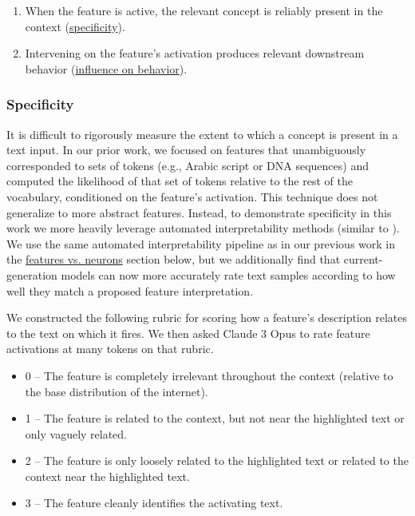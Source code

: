 \documentclass{article}
\begin{document}
\begin{enumerate}
    \item When the feature is active, the relevant concept is reliably present in the context (\hyperref[sec:assessing-tour-specificity]{specificity}).
    \item Intervening on the feature’s activation produces relevant downstream behavior (\hyperref[sec:assessing-tour-influence]{influence on behavior}).
\end{enumerate}

\subsubsection{Specificity}\label{sec:assessing-tour-specificity}

It is difficult to rigorously measure the extent to which a concept is present in a text input. In our prior work, we focused on features that unambiguously corresponded to sets of tokens (e.g., Arabic script or DNA sequences) and computed the likelihood of that set of tokens relative to the rest of the vocabulary, conditioned on the feature’s activation. This technique does not generalize to more abstract features. Instead, to demonstrate specificity in this work we more heavily leverage automated interpretability methods (similar to \cite{bills2023language,bricken2023monosemanticity}). We use the same automated interpretability pipeline as in our previous work \cite{bricken2023monosemanticity} in the \hyperref[sec:assessing-features-v-neurons]{features vs. neurons} section below, but we additionally find that current-generation models can now more accurately rate text samples according to how well they match a proposed feature interpretation.

We constructed the following rubric for scoring how a feature’s description relates to the text on which it fires. We then asked Claude 3 Opus to rate feature activations at many tokens on that rubric.

\begin{itemize}
    \item 0 -- The feature is completely irrelevant throughout the context (relative to the base distribution of the internet).
    \item 1 -- The feature is related to the context, but not near the highlighted text or only vaguely related.
    \item 2 -- The feature is only loosely related to the highlighted text or related to the context near the highlighted text.
    \item 3 -- The feature cleanly identifies the activating text.
\end{itemize}
\end{document}
